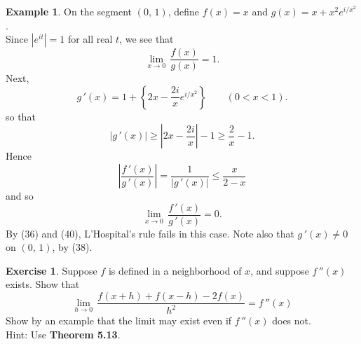 \documentclass[12pt]{book}
\theoremstyle{definition}
\newtheorem{example}{Example}
\newtheorem{exercise}{Exercise}
\begin{document}
		\begin{example}
			On the segment $(0,\,1)$, define $f(x)=x$ and $g(x)=x+x^2 e^{i/x^2}$.\\
			Since $\left|e^{it}\right|=1$ for all real $t$, we see that
			\begin{equation}\tag{36}
				\lim_{x\rightarrow0}\,\dfrac{f(x)}{g(x)}=1.
			\end{equation}
			Next,\begin{equation*}
				g\,'(x)=1+\left\{2x-\dfrac{2i}{x}e^{i/x^2}\right\}\qquad (0<x<1).
			\end{equation*}
			so that
			\begin{equation}\tag{38}
				|g\,'(x)|\geq\left|2x-\dfrac{2i}{x}\right|-1\geq\dfrac{2}{x}-1.
			\end{equation}
			Hence\begin{equation*}
				\left|\dfrac{f\,'(x)}{g\,'(x)}\right|=\dfrac{1}{|g\,'(x)|}\leq\dfrac{x}{2-x}
			\end{equation*}
			and so
			\begin{equation}\tag{40}
				\lim_{x\rightarrow0}\,\dfrac{f\,'(x)}{g\,'(x)}=0.
			\end{equation}
			By (36) and (40), L'Hospital's rule fails in this case. Note also that $g\,'(x)\neq 0$ on $(0,\,1)$, by (38).\\
		\end{example}
		\newpage
		\begin{exercise}
			Suppose $f$ is defined in a neighborhood of $x$, and suppose $f\,''(x)$ exists. Show that
			\begin{equation*}
				\lim_{h\rightarrow0}\,\dfrac{f(x+h)+f(x-h)-2f(x)}{h^2}=f\,''(x)
			\end{equation*}
			Show by an example that the limit may exist even if $f\,''(x)$ does not.\\
			Hint: Use \textbf{Theorem 5.13}.
		\end{exercise}
\end{document}
